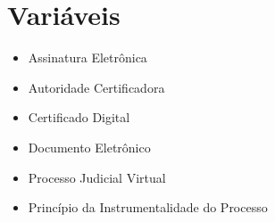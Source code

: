 \chapter{Variáveis}
\begin{itemize}
    \item Assinatura Eletrônica
    \item Autoridade Certificadora
    \item Certificado Digital
    \item Documento Eletrônico
    \item Processo Judicial Virtual
    \item Princípio da Instrumentalidade do Processo
\end{itemize}
